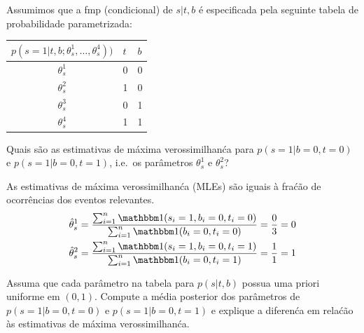 Assumimos que a fmp (condicional) de $s|t,b$ \'e especificada pela seguinte
tabela de probabilidade parametrizada:
\begin{center}
    \begin{tabular}{@{}cll@{}}
        \toprule
        $p(s=1 | t, b; \theta^1_s, \ldots, \theta_s^4))$ & $t$ & $b$\\
        \midrule
        $\theta^1_s$ & 0 & 0\\
        $\theta^2_s$ & 1 & 0\\
        $\theta^3_s$ & 0 & 1\\
        $\theta^4_s$ & 1 & 1\\
        \bottomrule
    \end{tabular}
\end{center}

\begin{exenumerate}
    \item Quais s\~ao as estimativas de m\'axima verossimilhan\'ca para $p(s=1 | b=0,
    t=0)$ e $p(s=1 | b=0, t=1)$, i.e.\ os par\^ametros $\theta^1_s$
    e $\theta^2_s$?
    
    \begin{solution}
        As estimativas de m\'axima verossimilhan\'ca (MLEs) s\~ao iguais \`a fra\'c\~ao de ocorr\^encias dos eventos relevantes.
        \begin{align}
            \hat{\theta}^1_s & =\frac{\sum_{i=1}^n \ind(s_i=1, b_i=0, t_i=0)}{\sum_{i=1}^n \ind(b_i=0, t_i=0)} = \frac{0}{3} = 0\\
            \hat{\theta}^2_s & =\frac{\sum_{i=1}^n \ind(s_i=1, b_i=0, t_i=1)}{\sum_{i=1}^n \ind(b_i=0, t_i=1)} = \frac{1}{1} = 1
        \end{align}
        
    \end{solution}
    
    \item Assuma que cada par\^ametro na tabela para $p(s | t,b)$ possua uma
    priori uniforme em $(0,1)$. Compute a m\'edia posterior dos
    par\^ametros de \mbox{$p(s=1 | b=0, t=0)$} e $p(s=1 | b=0, t=1)$
    e explique a diferen\'ca em rela\'c\~ao \`as estimativas de m\'axima verossimilhan\'ca.
    

\end{exenumerate}

